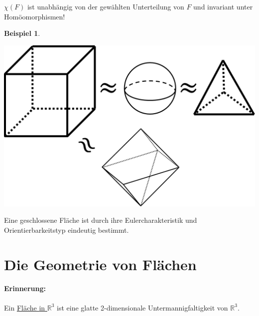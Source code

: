\documentclass[a4paper,11pt,notitlepage]{report}
\theoremstyle{definition}
\newtheorem{example}{Beispiel}[chapter]
\newcommand{\R}{{\ensuremath{\mathbb{R}}}}
\begin{document}
\begin{theorem}
	$\chi(F)$ ist unabhängig von der gewählten Unterteilung von $F$ und invariant unter Homöomorphismen!
\end{theorem}

\begin{example}
	\begin{center}
			\includegraphics[scale=0.5]{images/2012_01_12_Bild8.png}
	\end{center}
\end{example}

\begin{theorem}
	Eine geschlossene Fläche ist durch ihre Eulercharakteristik und Orientierbarkeitstyp eindeutig bestimmt.
\end{theorem}


\section{Die Geometrie von Flächen}
\paragraph{Erinnerung:} Ein \underline{Fläche \underline{in $\R^3$}} ist eine glatte 2-dimensionale Untermannigfaltigkeit von $\R^3$.
\end{document}
